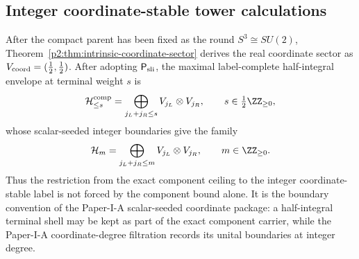 \documentclass[11pt,a4paper]{article}
\begin{document}
\subsection{Integer coordinate-stable tower calculations}
\label{p2b:app:integer-coordinate-stable-details}
\begin{proposition}
\label{p2:prop:integer-coordinate-stable-family}
After the compact parent has been fixed as the round
\(S^3\cong SU(2)\), Theorem~\ref{p2:thm:intrinsic-coordinate-sector}
derives the real coordinate sector as
\(V_{\rm coord}=(\tfrac12,\tfrac12)\).  After adopting
\(\mathsf P_{\rm sli}\), the maximal label-complete half-integral envelope at
terminal weight \(s\) is
\[
\mathcal H_{\le s}^{\rm comp}
=
\bigoplus_{j_L+j_R\le s}V_{j_L}\otimes V_{j_R},
\qquad s\in\tfrac12\ZZ_{\ge0},
\]
whose scalar-seeded integer boundaries give the family
\[
\mathcal H_m
=
\bigoplus_{j_L+j_R\le m}V_{j_L}\otimes V_{j_R},
\qquad m\in\ZZ_{\ge0}.
\]
Thus the restriction from the exact component ceiling to the integer
coordinate-stable label is not forced by the component bound alone.  It is the
boundary convention of the Paper-I-A scalar-seeded coordinate package:
a half-integral terminal shell may be kept as part of the exact component
carrier, while the Paper-I-A coordinate-degree filtration records its unital
boundaries at integer degree.
\end{proposition}
\end{document}

